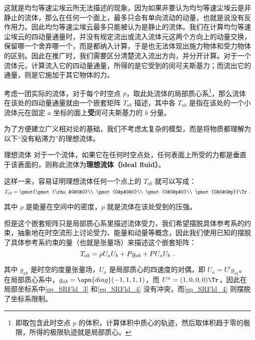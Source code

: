 这就是均匀等速尘埃云所无法描述的现象，因为如果非要认为均匀等速尘埃云是非静止的流体，那么在任何一个面上，最多只会有单向流动的动量，也就是说没有反作用力。因此均匀等速尘埃云最多只能被认为是静止的流体。我们在计算均匀等速尘埃云的四动量通量时，并没有规定流出或流入流体元这两个方向上的动量交换，保留哪一个舍弃哪一个，而是都纳入计算，于是也无法体现出施力物体和受力物体的区别。因此在推广时，我们需要区分清楚流入流出方向，并分开计算。对于一个流体元，计算流入它的四动量通量，所得的是它受到的闵可夫斯基力；而流出它的通量，则是它施加于其它物体的力。

\begin{definition}{}
考虑一团实际的流体，对于每个时空点 $p$，取此处流体的局部质心系\footnote{即取包含此时空点 $p$ 的体积，计算体积中质心的轨迹，然后取体积趋于零的极限，所得的极限轨迹就是局部质心。}，那么流体在该处的四动量通量就由一个嵌套矩阵 $T_{ab}$ 描述，其中各 $T_{ab}$ 是指在该处的一个小流体元在固定 $a$ 坐标的面上\textbf{受}闵可夫斯基力的 $b$ 分量。
\end{definition}


为了方便建立广义相对论的基础，我们不考虑太复杂的模型，而是将物质都理解为以下“没有粘滞力”的理想流体。


\begin{definition}{理想流体}
对于一个流体，如果它在任何时空点处，任何表面上所受的力都是垂直于该表面的，则称此流体为\textbf{理想流体（ideal fluid）}。
\end{definition}

这样一来，容易证明理想流体任何一个点上的 $T_{ab}$ 就可以写成：
\begin{equation}\label{eq_SRFld_3}
T_{ab}=\pmat{\pmat{\rho&0&0&0}\\
\pmat{0&p&0&0}\\
\pmat{0&0&p&0}\\
\pmat{0&0&0&p}}\Tr~.
\end{equation}

其中 $\rho$ 是能量在空间中的密度，$p$ 就是流体在该处受到的压强。

但是这个嵌套矩阵只是局部质心系里描述流体受力，我们希望摆脱具体参考系的约束，抽象地在时空流形上讨论受力、能量和动量等概念，因此我们使用已知的摆脱了具体参考系约束的量（也就是张量场）来描述这个嵌套矩阵：
\begin{equation}\label{eq_SRFld_4}
T_{ab}=\rho U_aU_b+P g_{ab}+P U_aU_b\\~.
\end{equation}

其中 $g_{ab}$ 是时空的度量张量场，$U_a$ 是局部质心的四速度的对偶，即 $U_a=U^ig_{ia}$。在局部质心系中，$g_{ab}=\opn{diag}(-1, 1, 1, 1)$，而 $U^{a}=(1, 0, 0 ,0)\Tr$，因此在局部坐标系中\autoref{eq_SRFld_3} 和\autoref{eq_SRFld_4} 没有冲突，而\autoref{eq_SRFld_4} 则摆脱了坐标系限制。

